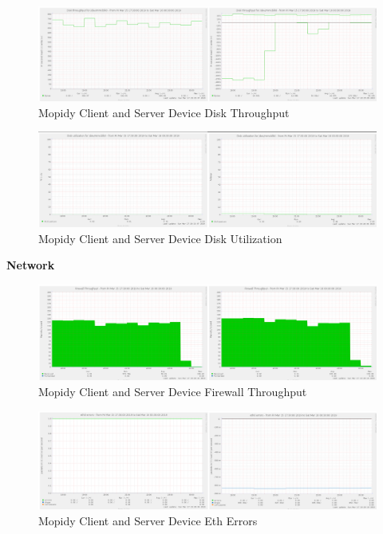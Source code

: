 \documentclass[11pt,a4paper,headinclude=false,footinclude=false]{scrreprt}
\begin{document}
\begin{figure}[H]
\includegraphics{ResultsAndAnalysis/MopidyServerTestImages/007MopidyDiskThroughput.png}
\centering
\caption{Mopidy Client and Server Device Disk Throughput}
\label{MopidyDiskThroughput}
\end{figure}

\begin{figure}[H]
\includegraphics{ResultsAndAnalysis/MopidyServerTestImages/009MopidyDiskUtilization.png}
\centering
\caption{Mopidy Client and Server Device Disk Utilization}
\label{MopidyDiskUtil}
\end{figure}

\textbf{Network}

\begin{figure}[H]
\includegraphics{ResultsAndAnalysis/MopidyServerTestImages/012MopidyFirewallThroughput.png}
\centering
\caption{Mopidy Client and Server Device Firewall Throughput}
\label{MopidyFirewallThroughput}
\end{figure}

\begin{figure}[H]
\includegraphics{ResultsAndAnalysis/MopidyServerTestImages/010MopidyEth0Errors.png}
\centering
\caption{Mopidy Client and Server Device Eth Errors}
\label{MopidyEthError}
\end{figure}
\end{document}
